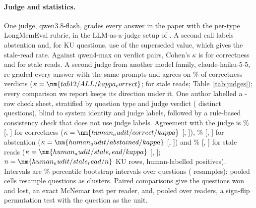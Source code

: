 \paragraph{Judge and statistics.}
One judge, qwen3.8-flash, grades every answer in the paper with the per-type LongMemEval rubric, in the LLM-as-a-judge setup of \citet{zheng2023judging}. A second call labels abstention and, for KU questions, use of the superseded value, which gives the stale-read rate. Against qwen4-max on  verdict pairs, Cohen's $\kappa$ is  for correctness and  for stale reads. A second judge from another model family, claude-haiku-5-5, re-graded every answer with the same prompts and agrees on \% of correctness verdicts ($\kappa=\nm{tab12/ALL/kappa_correct}$;  for stale reads; Table~\ref{tab:judges}); every comparison we report keeps its direction under it. One author labelled a -row check sheet, stratified by question type and judge verdict ( distinct questions), blind to system identity and judge labels, followed by a rule-based consistency check that does not use judge labels. Agreement with the judge is \% [, ] for correctness ($\kappa=\nm{human_audit/correct/kappa}$ [, ]), \% [, ] for abstention ($\kappa=\nm{human_audit/abstained/kappa}$ [, ]) and \% [, ] for stale reads ($\kappa=\nm{human_audit/stale_read/kappa}$ [, ]; $n=\nm{human_audit/stale_read/n}$ KU rows,  human-labelled positives). Intervals are \% percentile bootstrap intervals over questions ( resamples); pooled cells resample questions as clusters. Paired comparisons give the questions won and lost, an exact McNemar test per reader, and, pooled over readers, a sign-flip permutation test with the question as the unit.

